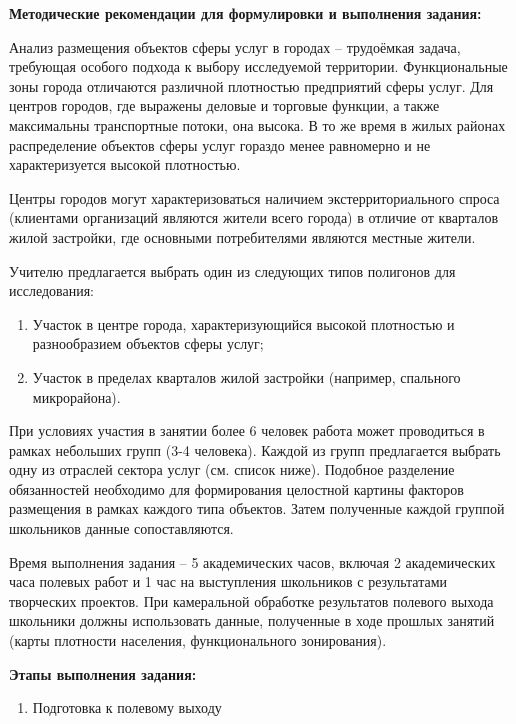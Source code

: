 \documentclass[
  11pt,
  russian,
]{book}
\providecommand{\tightlist}{%
  \setlength{\itemsep}{0pt}\setlength{\parskip}{0pt}}
\begin{document}
\textbf{Методические рекомендации для формулировки и выполнения задания:}

Анализ размещения объектов сферы услуг в городах -- трудоёмкая задача, требующая особого подхода к выбору исследуемой территории. Функциональные зоны города отличаются различной плотностью предприятий сферы услуг. Для центров городов, где выражены деловые и торговые функции, а также максимальны транспортные потоки, она высока. В то же время в жилых районах распределение объектов сферы
услуг гораздо менее равномерно и не характеризуется высокой плотностью.

Центры городов могут характеризоваться наличием экстерриториального спроса (клиентами организаций являются жители всего города) в отличие от кварталов жилой застройки, где основными потребителями являются местные жители.

Учителю предлагается выбрать один из следующих типов полигонов для исследования:

\begin{enumerate}
\def\labelenumi{\arabic{enumi})}
\tightlist
\item
  Участок в центре города, характеризующийся высокой плотностью и разнообразием объектов сферы услуг;
\item
  Участок в пределах кварталов жилой застройки (например, спального микрорайона).
\end{enumerate}

При условиях участия в занятии более 6 человек работа может проводиться в рамках небольших групп (3-4 человека). Каждой из групп предлагается выбрать одну из отраслей сектора услуг (см. список ниже). Подобное разделение обязанностей необходимо для формирования целостной картины факторов размещения в рамках каждого типа объектов. Затем полученные каждой группой школьников данные сопоставляются.

Время выполнения задания -- 5 академических часов, включая 2 академических часа полевых работ и 1 час на выступления школьников с результатами творческих проектов. При камеральной обработке результатов полевого выхода школьники должны использовать данные, полученные в ходе прошлых занятий (карты плотности населения, функционального зонирования).

\textbf{Этапы выполнения задания:}

\begin{enumerate}
\def\labelenumi{\arabic{enumi}.}
\tightlist
\item
  Подготовка к полевому выходу
\end{enumerate}
\end{document}
